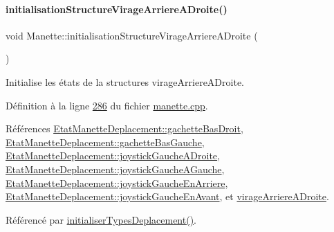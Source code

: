 \mbox{\label{class_manette_a9097a15ce44cb2535ce6e6099a8b2095}} 
\paragraph{\texorpdfstring{initialisation\+Structure\+Virage\+Arriere\+A\+Droite()}{initialisationStructureVirageArriereADroite()}}
{\footnotesize\ttfamily void Manette\+::initialisation\+Structure\+Virage\+Arriere\+A\+Droite (\begin{DoxyParamCaption}{ }\end{DoxyParamCaption})\hspace{0.3cm}{\ttfamily [private]}}



Initialise les états de la structures virage\+Arriere\+A\+Droite. 



Définition à la ligne \hyperlink{manette_8cpp_source_l00286}{286} du fichier \hyperlink{manette_8cpp_source}{manette.\+cpp}.



Références \hyperlink{manette_8h_source_l00185}{Etat\+Manette\+Deplacement\+::gachette\+Bas\+Droit}, \hyperlink{manette_8h_source_l00184}{Etat\+Manette\+Deplacement\+::gachette\+Bas\+Gauche}, \hyperlink{manette_8h_source_l00183}{Etat\+Manette\+Deplacement\+::joystick\+Gauche\+A\+Droite}, \hyperlink{manette_8h_source_l00182}{Etat\+Manette\+Deplacement\+::joystick\+Gauche\+A\+Gauche}, \hyperlink{manette_8h_source_l00181}{Etat\+Manette\+Deplacement\+::joystick\+Gauche\+En\+Arriere}, \hyperlink{manette_8h_source_l00180}{Etat\+Manette\+Deplacement\+::joystick\+Gauche\+En\+Avant}, et \hyperlink{manette_8h_source_l00242}{virage\+Arriere\+A\+Droite}.



Référencé par \hyperlink{manette_8cpp_source_l00085}{initialiser\+Types\+Deplacement()}.


